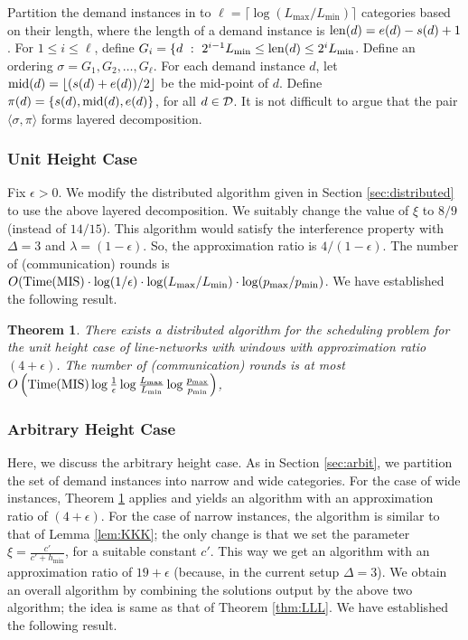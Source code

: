 \documentclass[11pt]{article}
\newtheorem{theorem}{\bf Theorem}[section]
\newcommand{\calD} {{\cal D}}
\newcommand{\TMIS} {{\rm Time(MIS)}}
\newcommand{\pair}[2] {\langle #1,#2 \rangle}
\newcommand{\ceil}[1] {\lceil #1 \rceil}
\newcommand{\floor}[1] {\lfloor #1 \rfloor}
\newcommand{\len} {{\rm len}}
\newcommand{\mymid} {{\rm mid}}
\newcommand{\hmin} {h_{\min}}
\begin{document}
Partition the demand instances in to $\ell=\ceil{\log(L_{\max}/L_{\min})}$ categories based
on their length, where the length of a demand instance is $\len(d)=e(d)-s(d)+1$.
For $1\leq i\leq \ell$, define $G_i = \{d~:~2^{i-1} L_{\min} \leq \len(d) \leq 2^i L_{\min}$.
Define an ordering $\sigma=G_1, G_2, \ldots, G_{\ell}$.
For each demand instance $d$, let $\mymid(d)=\floor{(s(d)+e(d))/2}$ be the mid-point of $d$.
Define $\pi(d)=\{s(d),\mymid(d),e(d)\}$, for all $d\in \calD$.
It is not difficult to argue that the pair $\pair{\sigma}{\pi}$ forms layered decomposition.

\subsubsection*{Unit Height Case}
Fix $\epsilon>0$. We modify the distributed algorithm given in Section \ref{sec:distributed}
to use the above layered decomposition. We suitably change the value of $\xi$ to 
$8/9$ (instead of $14/15$). This algorithm would satisfy the interference property with $\Delta=3$
and $\lambda=(1-\epsilon)$. So, the approximation ratio is $4/(1-\epsilon)$.
The number of (communication) 
rounds is $O(\TMIS \cdot \log(1/\epsilon) \cdot \log(L_{\max}/L_{\min})\cdot \log(p_{\max}/p_{\min})$.
We have established the following result.

\begin{theorem}
\label{thm:MMM}
There exists a distributed algorithm for the scheduling problem for the unit height case of line-networks with windows
with approximation ratio $(4+\epsilon)$. The number of (communication) rounds is at most 
$O\left( \TMIS \log{ \frac{1}{\epsilon} } \log \frac{L_{\max}}{L_{\min}} \log{ \frac{p_{\max}}{p_{\min}} }\right)$,
\end{theorem}

\subsubsection*{Arbitrary Height Case}
Here, we discuss the arbitrary height case. As in Section \ref{sec:arbit}, we partition
the set of demand instances into narrow and wide categories.
For the case of wide instances, Theorem \ref{thm:MMM} applies and 
yields an algorithm with an approximation ratio of $(4+\epsilon)$.
For the case of narrow instances, the algorithm is similar to that of Lemma \ref{lem:KKK};
the only change is that we set the parameter $\xi=\frac{c'}{c'+\hmin}$, for a suitable constant $c'$.
This way we get an algorithm with an approximation ratio of $19+\epsilon$ 
(because, in the current setup $\Delta=3$).
We obtain an overall algorithm by combining the solutions output by the above two algorithm;
the idea is same as that of Theorem \ref{thm:LLL}. We have established the following result.
\end{document}
